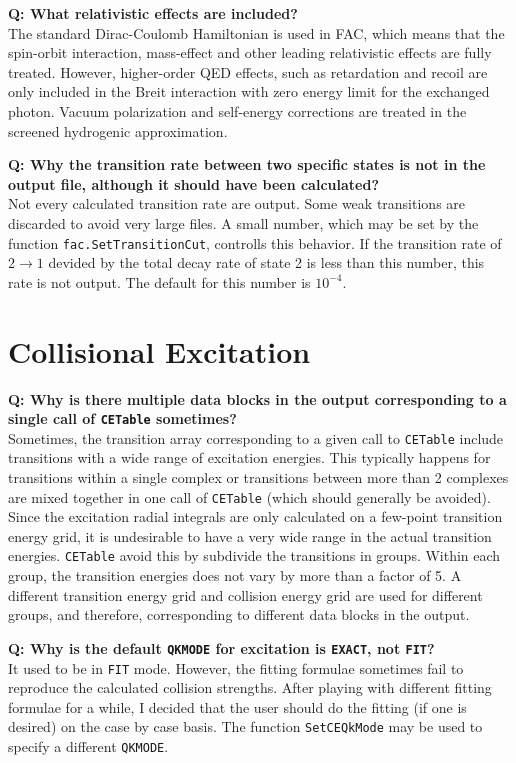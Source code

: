 \documentclass[twoside,letterpaper]{refrep}
\newcommand{\key}[1]{\texttt{#1}}
\newcounter{faq}[section]
\newcommand{\faq}[2]{\stepcounter{faq}
	\begin{minipage}{\textwidth}
	\textbf{Q\arabic{faq}: #1?}\\#2
	\end{minipage}}
\begin{document}
\faq{What relativistic effects are included}{
The standard Dirac-Coulomb Hamiltonian is used in FAC, which means that the
spin-orbit interaction, mass-effect and other leading relativistic effects are
fully treated. However, higher-order QED effects, such as retardation and
recoil are only included in the Breit interaction with zero energy limit for
the exchanged photon. Vacuum polarization and self-energy corrections are
treated in the screened hydrogenic approximation.}

\faq{Why the transition rate between two specific states is not in the output
file, although it should have been calculated}{
Not every calculated transition rate are output. Some weak transitions are
discarded to avoid very large files. A small number, which may be set by the
function \key{fac.SetTransitionCut}, controlls this behavior. If the
transition rate of $2\to 1$ devided by the total decay rate of state 2 is less
than this number, this rate is not output. The default for this number is
$10^{-4}$.}

\section{Collisional Excitation}
\faq{Why is there multiple data blocks in the output corresponding to a single
call of \key{CETable} sometimes}{
Sometimes, the transition array corresponding to a given call to \key{CETable}
include transitions with a wide range of excitation energies. This typically
happens for transitions within a single complex or transitions between more
than 2 complexes are mixed together in one call of \key{CETable} (which should
generally be avoided). Since the excitation radial integrals are only
calculated on a few-point transition energy grid, it is undesirable to have a
very wide range in the actual transition energies. \key{CETable} avoid this by
subdivide the transitions in groups. Within each group, the transition
energies does not vary by more than a factor of 5. A different transition
energy grid and collision energy grid are used for different groups, and
therefore, corresponding to different data blocks in the output.}

\faq{Why is the default \key{QKMODE} for excitation is \key{EXACT}, not
\key{FIT}}{
It used to be in \key{FIT} mode. However, the fitting formulae sometimes fail
to reproduce the calculated collision strengths. After playing with different
fitting formulae for a while, I decided that the user should do the fitting
(if one is desired) on the case by case basis. The function \key{SetCEQkMode}
may be used to specify a different \key{QKMODE}.}
\end{document}
